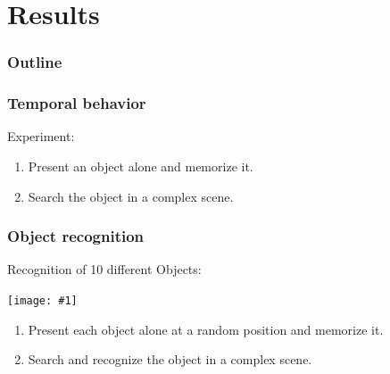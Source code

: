 \documentclass[12]{beamer}
\newcommand{\showGrafic}[2]{
	\begin{center}
		\texttt{[image: \#1]}
	\end{center}
}
\begin{document}
\section{Results}

\begin{frame}
  \frametitle{Outline}
  \tableofcontents[currentsection]
\end{frame}

\begin{frame}
 	\frametitle{Temporal behavior}
	Experiment:
	\begin{enumerate}
	  \item Present an object alone and memorize it.
	  \item Search the object in a complex scene.
	\end{enumerate}
	\begin{figure}
	   \quad \quad \quad \quad
	\end{figure}
\end{frame}

\begin{frame}
 	\frametitle{Object recognition}
	Recognition of 10 different Objects:
	\showGrafic{objectsGray_b}{0.6}
	\begin{enumerate}
	  \item Present each object alone at a random position and memorize it.
	  \item Search and recognize the object in a complex scene.
	\end{enumerate}	
\end{frame}
\end{document}

